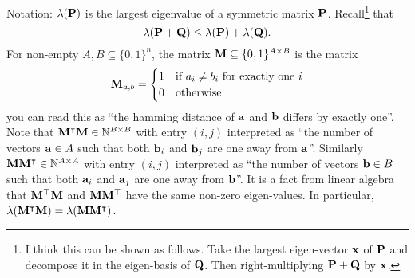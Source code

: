\documentclass[11pt]{article}
\begin{document}
	Notation: $\lambda(\mathbf{P})$ is the largest eigenvalue of a symmetric matrix $\mathbf{P}$. Recall\footnote{I think this can be shown as follows. Take the largest eigen-vector $\mathbf{x}$ of $\mathbf{P}$ and decompose it in the eigen-basis of $\mathbf{Q}$. Then right-multiplying $\mathbf{P} + \mathbf{Q}$ by $\mathbf{x}$.} that 
	\[\lambda(\mathbf{P} + \mathbf{Q}) \leq \lambda(\mathbf{P}) + \lambda(\mathbf{Q}).\]
	For non-empty $A, B \subseteq \{0,1\}^n$, the matrix $\mathbf{M} \subseteq \{0,1\}^{A\times B}$ is the matrix 
	\[\mathbf{M}_{a,b} = \begin{cases}
	1 &\mbox{if $a_i \neq b_i$ for exactly one $i$}\\
	0 &\mbox{otherwise}
	\end{cases}\]
	you can read this as ``the hamming distance of $\mathbf{a}$ and $\mathbf{b}$ differs by exactly one''. Note that $\mathbf{M}^{\intercal}\mathbf{M} \in \mathbb{N}^{B \times B}$ with entry $(i,j)$ interpreted as ``the number of vectors $\mathbf{a} \in A$ such that both $\mathbf{b}_i$ and $\mathbf{b}_j$ are one away from $\mathbf{a}$''. Similarly $\mathbf{M}\mathbf{M}^{\intercal} \in \mathbb{N}^{A \times A}$ with entry $(i,j)$ interpreted as ``the number of vectors $\mathbf{b} \in B$ such that both $\mathbf{a}_i$ and $\mathbf{a}_j$ are one away from $\mathbf{b}$''. It is a fact from linear algebra that $\mathbf{M}^{\top}\mathbf{M}$ and $\mathbf{M}\mathbf{M}^{\top}$ have the same non-zero eigen-values. In particular,  $\lambda(\mathbf{M}^{\intercal}\mathbf{M}) = \lambda(\mathbf{M}\mathbf{M}^{\intercal})$.
	
\end{document}
